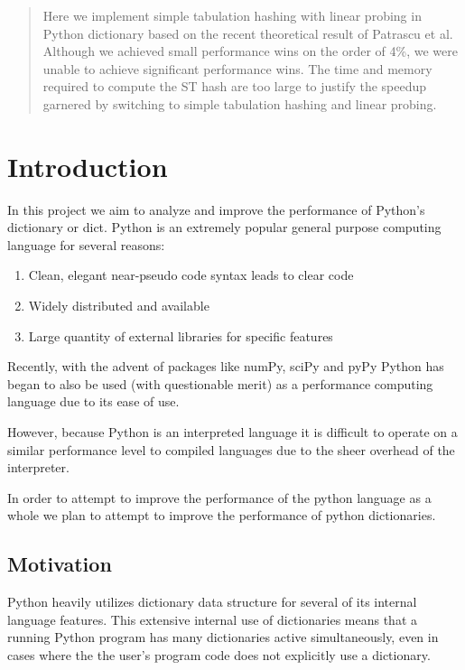 \documentclass[12pt]{article}
\begin{document}
\maketitle

\begin{abstract}
Here we implement simple tabulation hashing with linear probing in Python dictionary based on the recent theoretical result of Patrascu et al. Although we achieved small performance wins on the order of 4\%, we were unable to achieve significant performance wins.  The time and memory required to compute the ST hash are too large to justify the speedup garnered by switching to simple tabulation hashing and linear probing.
\end{abstract}


\section{Introduction}
In this project we aim to analyze and improve the performance of Python’s dictionary or dict.  Python is an extremely popular general purpose computing language for several reasons:
\begin{enumerate}
 \item Clean, elegant near-pseudo code syntax leads to clear code 
 \item Widely distributed and available
 \item Large quantity of external libraries for specific features 
\end{enumerate}

Recently, with the advent of packages like numPy, sciPy and pyPy Python has began to also be used (with questionable merit) as a performance computing language due to its ease of use.

However, because Python is an interpreted language it is difficult to operate on a similar performance level to compiled languages due to the sheer overhead of the interpreter.

In order to attempt to improve the performance of the python language as a whole we plan to attempt to improve the performance of python dictionaries.

\subsection{Motivation}
Python heavily utilizes dictionary data structure for several of its internal language features. This extensive internal use of dictionaries means that a running Python program has many dictionaries active simultaneously, even in cases where the the user’s program code does not explicitly use a dictionary. 
\end{document}
